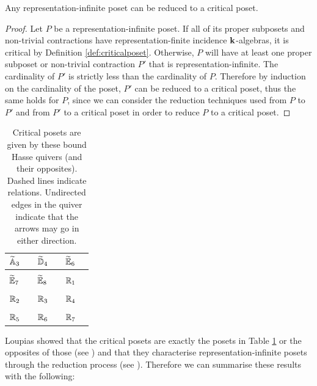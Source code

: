 \begin{lemma}\label{lemma:infinitereduction}
	Any representation-infinite poset can be reduced to a critical poset.
\end{lemma}
\begin{proof}
	Let $P$ be a representation-infinite poset. If all of its proper subposets and non-trivial contractions have representation-finite incidence $\mathbf{k}$-algebras, it is critical by Definition \ref{def:criticalposet}.
	Otherwise, $P$ will have at least one proper subposet or non-trivial contraction $P'$ that is representation-infinite. The cardinality of $P'$ is strictly less than the cardinality of $P$. Therefore by induction on the cardinality of the poset, $P'$ can be reduced to a critical poset, thus the same holds for $P$, since we can consider the reduction techniques used from $P$ to $P'$ and from $P'$ to a critical poset in order to reduce $P$ to a critical poset.
\end{proof}

\captionsetup[table]{skip=10pt}
\begin{table}[ht!]
	\centering
	\begin{tabular}{cc|cc|cc}
		$\widetilde{\mathbb{A}}_3$& \posetAthreetilde{} & $\widetilde{\mathbb{D}}_4$  & \posetDfourtilde{} & $\widetilde{\mathbb{E}}_6$& \posetEsixtilde{} \\[3pt] \hline
		&&&&& \\[-6pt]
		$\widetilde{\mathbb{E}}_7$ & \posetEseventilde{} & $\widetilde{\mathbb{E}}_8$& \posetEeighttilde{} & $\mathbb{R}_1$ & \posetRone{} \\[3pt]  \hline
		&&&&& \\[-6pt]
		$\mathbb{R}_2$& \posetRtwo{} & $\mathbb{R}_3$ & \posetRthree{} & $\mathbb{R}_4$& \posetRfour{} \\[3pt] \hline
		&&&&& \\[-10pt]
		$\mathbb{R}_5$ & \posetRfive{} &$\mathbb{R}_6$ & \posetRsix{} & $\mathbb{R}_7$ &  \posetRseven{} \\[3pt] 
	\end{tabular}
	\caption{Critical posets are given by these bound Hasse quivers (and their opposites). Dashed lines indicate relations. Undirected edges in the quiver indicate that the arrows may go in either direction.}
	\label{tab:Loupias frames}
\end{table}

Loupias showed that the critical posets are exactly the posets in Table \ref{tab:Loupias frames} or the opposites of those (see \cite[Theorem 1.4]{lou:ind}) and that they characterise representation-infinite posets through the reduction process (see \cite[Theorem 1.5]{lou:ind}). Therefore we can summarise these results with the following:

